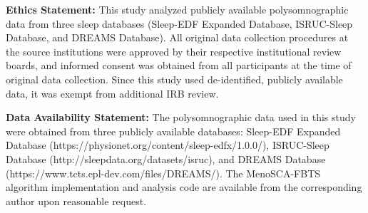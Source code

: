 \documentclass[ASNA,twocolumn]{USG}
\begin{document}

\maketitle

\noindent\textbf{Ethics Statement:} This study analyzed publicly available polysomnographic data from three sleep databases (Sleep-EDF Expanded Database, ISRUC-Sleep Database, and DREAMS Database). All original data collection procedures at the source institutions were approved by their respective institutional review boards, and informed consent was obtained from all participants at the time of original data collection. Since this study used de-identified, publicly available data, it was exempt from additional IRB review.

\noindent\textbf{Data Availability Statement:} The polysomnographic data used in this study were obtained from three publicly available databases: Sleep-EDF Expanded Database (https://physionet.org/content/sleep-edfx/1.0.0/), ISRUC-Sleep Database (http://sleepdata.org/datasets/isruc), and DREAMS Database (https://www.tcts.epl-dev.com/files/DREAMS/). The MenoSCA-FBTS algorithm implementation and analysis code are available from the corresponding author upon reasonable request.
\end{document}
